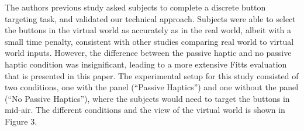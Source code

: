 \documentclass[]{aiaa-tc}%
\begin{document}
The authors previous study\cite{r3c} asked subjects to complete a discrete button targeting task, and validated our technical approach.
Subjects were able to select the buttons in the virtual world as accurately as in the real world, albeit with a small time penalty, consistent with other studies comparing real world to virtual world inputs\cite{eight}.
However, the difference between the passive haptic and no passive haptic condition was insignificant, leading to a more extensive Fitts evaluation that is presented in this paper.
The experimental setup for this study consisted of two conditions, one with the panel (``Passive Haptics'') and one without the panel (``No Passive Haptics''), where the subjects would need to target the buttons in mid-air.
The different conditions and the view of the virtual world is shown in Figure 3.
\end{document}
